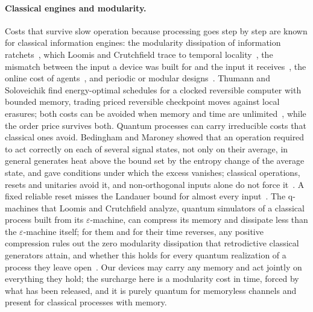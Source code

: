 \paragraph{Classical engines and modularity.} Costs that survive slow operation because processing goes step by step are known for classical information engines: the modularity dissipation of information ratchets~\cite{BMC18,BMRC17}, which Loomis and Crutchfield trace to temporal locality~\cite{LoomisCrutchfield20}, the mismatch between the input a device was built for and the input it receives~\cite{KolchinskyWolpert21}, the online cost of agents~\cite{Thompson25}, and periodic or modular designs~\cite{OuldridgeWolpert23}. Thumann and Soloveichik find energy-optimal schedules for a clocked reversible computer with bounded memory, trading priced reversible checkpoint moves against local erasures; both costs can be avoided when memory and time are unlimited~\cite{ThumannSoloveichik26}, while the order price survives both. Quantum processes can carry irreducible costs that classical ones avoid. Bedingham and Maroney showed that an operation required to act correctly on each of several signal states, not only on their average, in general generates heat above the bound set by the entropy change of the average state, and gave conditions under which the excess vanishes; classical operations, resets and unitaries avoid it, and non-orthogonal inputs alone do not force it~\cite{BedinghamMaroney}. A fixed reliable reset misses the Landauer bound for almost every input~\cite{RiechersGu21}. The q-machines that Loomis and Crutchfield analyze, quantum simulators of a classical process built from its $\varepsilon$-machine, can compress its memory and dissipate less than the $\varepsilon$-machine itself; for them and for their time reverses, any positive compression rules out the zero modularity dissipation that retrodictive classical generators attain, and whether this holds for every quantum realization of a process they leave open~\cite{LoomisCrutchfield20,LoomisCrutchfield20PRL}. Our devices may carry any memory and act jointly on everything they hold; the surcharge here is a modularity cost in time, forced by what has been released, and it is purely quantum for memoryless channels and present for classical processes with memory.

